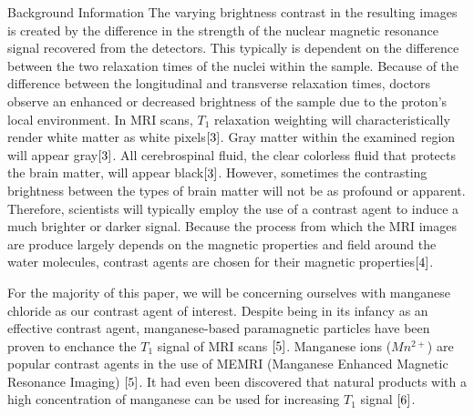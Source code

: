 \documentclass[a4paper,12pt]{article}
\begin{document}
\begin{section}{Background Information}
The varying brightness contrast in the resulting images is created by the difference in the strength of the nuclear magnetic resonance signal recovered from the detectors. 
This typically is dependent on the difference between the two relaxation times of the nuclei within the sample. Because of the difference between the longitudinal and transverse relaxation times, doctors observe an enhanced or decreased brightness of the sample due to the proton's local environment. In MRI scans, $T_1$ relaxation weighting will characteristically render white matter as white pixels$\cite{3}$. Gray matter within the examined region will appear gray$\cite{3}$. All cerebrospinal fluid, the clear colorless fluid that protects the brain matter, will appear black$\cite{3}$. However, sometimes the contrasting brightness between the types of brain matter will not be as profound or apparent. Therefore, scientists will typically employ the use of a contrast agent to induce a much brighter or darker signal. Because the process from which the MRI images are produce largely depends on the magnetic properties and field around the water molecules, contrast agents are chosen for their magnetic properties$\cite{4}$. 

For the majority of this paper, we will be concerning ourselves with manganese chloride as our contrast agent of interest. Despite being in its infancy as an effective contrast agent, manganese-based paramagnetic particles have been proven to enchance the $T_1$ signal of MRI scans $\cite{5}$. Manganese ions ($Mn^{2+}$) are popular contrast agents in the use of MEMRI (Manganese Enhanced Magnetic Resonance Imaging) $\cite{5}$. It had even been discovered that natural products with a high concentration of manganese can be used for increasing $T_1$ signal $\cite{6}$.


\end{section}
\end{document}
